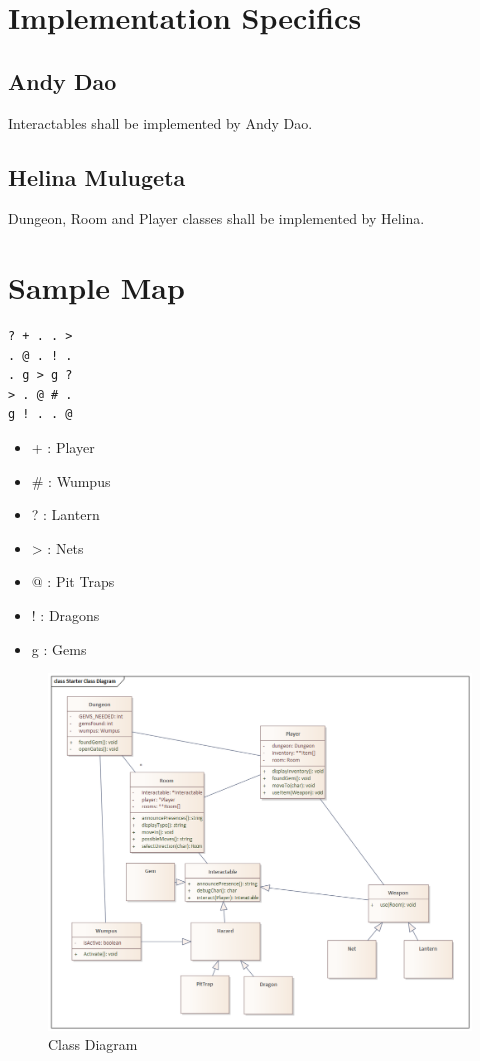 \documentclass{formalLabReport} %
\begin{document}
\section{Implementation Specifics}
\subsection{Andy Dao}

Interactables shall be implemented by Andy Dao.

\subsection{Helina Mulugeta}
Dungeon, Room and Player classes shall be implemented by Helina.

\section{Sample Map}
\begin{verbatim}
? + . . >
. @ . ! .
. g > g ?
> . @ # .
g ! . . @
\end{verbatim}

\begin{itemize}
    \item + : Player
    \item \# : Wumpus
    \item ? : Lantern
    \item > : Nets
    \item $@$ : Pit Traps
    \item ! : Dragons
    \item g : Gems
\end{itemize}

\begin{figure}
    \centering
    \includegraphics[width=1\linewidth]{Class Diagram.png}
    \caption{Class Diagram}
    \label{fig:enter-label}
\end{figure}
\end{document}
